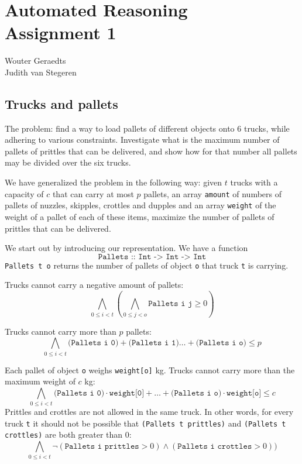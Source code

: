 \documentclass[12pt]{article}
\begin{document}
\section*{Automated Reasoning\\Assignment 1}

\begin{center}
Wouter Geraedts \\
Judith van Stegeren\\
\end{center}

\vspace{8mm}

\subsection*{Trucks and pallets}
The problem: find a way to load pallets of different objects onto 6 trucks, while adhering to various constraints. Investigate what is the maximum number of pallets of prittles that can be delivered, and show how for that number all pallets may be divided over the six trucks.

We have generalized the problem in the following way: given $t$ trucks with a capacity of $c$ that can carry at most $p$ pallets, an array \texttt{amount} of numbers of pallets of nuzzles, skipples, crottles and dupples and an array \texttt{weight} of the weight of a pallet of each of these items, maximize the number of pallets of prittles that can be delivered.

We start out by introducing our representation. We have a function 
\[\texttt{Pallets :: Int -> Int -> Int}\]
\texttt{Pallets t o} returns the number of pallets of object \texttt{o} that truck \texttt{t} is carrying.

Trucks cannot carry a negative amount of pallets:
\[ \bigwedge_{0 \le i < t} ( \bigwedge_{0 \le j < o} \texttt{Pallets i j} \ge 0 ) \]

Trucks cannot carry more than $p$ pallets:
\[ \bigwedge_{0 \le i < t} \texttt{(Pallets i 0)} + \texttt{(Pallets i 1)} \dots + \texttt{(Pallets i o)} \le p\]

Each pallet of object \texttt{o} weighs \texttt{weight[o]} kg. Trucks cannot carry more than the maximum weight of $c$ kg:
\[ \bigwedge_{0 \le i < t} \texttt{(Pallets i 0)} \cdot \texttt{weight[0]} + \dots + \texttt{(Pallets i o)} \cdot \texttt{weight[o]} \le c \]
Prittles and crottles are not allowed in the same truck. In other words, for every truck \texttt{t} it should not be possible that \texttt{(Pallets t prittles)} and \texttt{(Pallets t crottles)} are both greater than 0:
\[ \bigwedge_{0 \le i < t} \neg ( \texttt{Pallets i prittles} > 0) \wedge (\texttt{Pallets i crottles} > 0 ))\]
\end{document}
